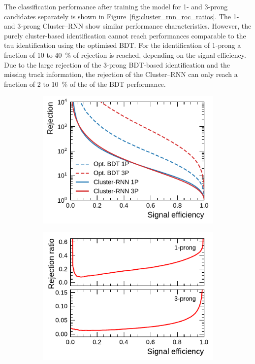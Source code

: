 The classification performance after training the model for 1- and 3-prong
\tauhadvis candidates separately is shown in
Figure~\ref{fig:cluster_rnn_roc_ratios}. The 1- and 3-prong Cluster--RNN show
similar performance characteristics. However, the purely cluster-based
identification cannot reach performances comparable to the tau identification
using the optimised BDT. For the identification of 1-prong \tauhadvis a fraction
of \num{10} to \SI{40}{\percent} of rejection is reached, depending on the
signal efficiency. Due to the large rejection of the 3-prong BDT-based
identification and the missing track information, the rejection of the
Cluster--RNN can only reach a fraction of \num{2} to \SI{10}{\percent} of the of
the BDT performance.

\begin{figure}[htb]
  \begin{subfigure}[t]{0.48\textwidth}
    \centering
    \includegraphics{./figures/rnn/cluster/roc_fixed.pdf}
  \end{subfigure}\hfill
  \begin{subfigure}[t]{0.48\textwidth}
    \centering
    \includegraphics{./figures/rnn/cluster/ratios.pdf}

\end{subfigure}
\end{figure}
